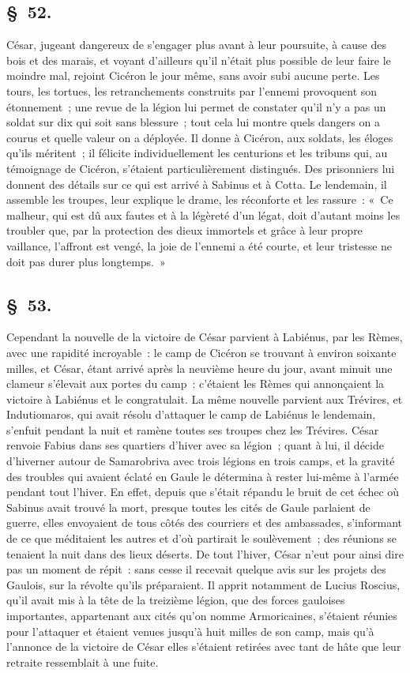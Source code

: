 \documentclass[french,twoside]{book} %
\begin{document}
\subsection[{§ 52.}]{ \textsc{§ 52.} }
\noindent César, jugeant dangereux de s’engager plus avant à leur poursuite, à cause des bois et des marais, et voyant d’ailleurs qu’il n’était plus possible de leur faire le moindre mal, rejoint Cicéron le jour même, sans avoir subi aucune perte. Les tours, les tortues, les retranchements construits par l’ennemi provoquent son étonnement ; une revue de la légion lui permet de constater qu’il n’y a pas un soldat sur dix qui soit sans blessure ; tout cela lui montre quels dangers on a courus et quelle valeur on a déployée. Il donne à Cicéron, aux soldats, les éloges qu’ils méritent ; il félicite individuellement les centurions et les tribuns qui, au témoignage de Cicéron, s’étaient particulièrement distingués. Des prisonniers lui donnent des détails sur ce qui est arrivé à Sabinus et à Cotta. Le lendemain, il assemble les troupes, leur explique le drame, les réconforte et les rassure : « Ce malheur, qui est dû aux fautes et à la légèreté d’un légat, doit d’autant moins les troubler que, par la protection des dieux immortels et grâce à leur propre vaillance, l’affront est vengé, la joie de l’ennemi a été courte, et leur tristesse ne doit pas durer plus longtemps. »
\subsection[{§ 53.}]{ \textsc{§ 53.} }
\noindent Cependant la nouvelle de la victoire de César parvient à Labiénus, par les Rèmes, avec une rapidité incroyable : le camp de Cicéron se trouvant à environ soixante milles, et César, étant arrivé après la neuvième heure du jour, avant minuit une clameur s’élevait aux portes du camp : c’étaient les Rèmes qui annonçaient la victoire à Labiénus et le congratulait. La même nouvelle parvient aux Trévires, et Indutiomaros, qui avait résolu d’attaquer le camp de Labiénus le lendemain, s’enfuit pendant la nuit et ramène toutes ses troupes chez les Trévires. César renvoie Fabius dans ses quartiers d’hiver avec sa légion ; quant à lui, il décide d’hiverner autour de Samarobriva avec trois légions en trois camps, et la gravité des troubles qui avaient éclaté en Gaule le détermina à rester lui-même à l’armée pendant tout l’hiver. En effet, depuis que s’était répandu le bruit de cet échec où Sabinus avait trouvé la mort, presque toutes les cités de Gaule parlaient de guerre, elles envoyaient de tous côtés des courriers et des ambassades, s’informant de ce que méditaient les autres et d’où partirait le soulèvement ; des réunions se tenaient la nuit dans des lieux déserts. De tout l’hiver, César n’eut pour ainsi dire pas un moment de répit : sans cesse il recevait quelque avis sur les projets des Gaulois, sur la révolte qu’ils préparaient. Il apprit notamment de Lucius Roscius, qu’il avait mis à la tête de la treizième légion, que des forces gauloises importantes, appartenant aux cités qu’on nomme Armoricaines, s’étaient réunies pour l’attaquer et étaient venues jusqu’à huit milles de son camp, mais qu’à l’annonce de la victoire de César elles s’étaient retirées avec tant de hâte que leur retraite ressemblait à une fuite.
\end{document}
